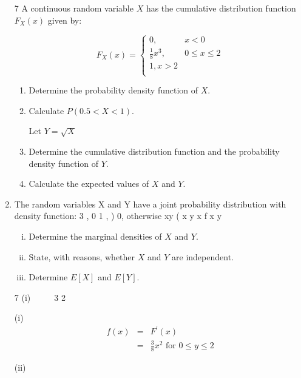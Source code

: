 \documentclass[a4paper,12pt]{article}
\begin{document}
\begin{enumerate}

7 A continuous random variable $X$ has the cumulative distribution function $F_X(x)$ given
by:


\[ F_X(x) = \begin{cases}
0, & x <0 \\
\frac{1}{8}x^3 , & 0 \leq x \leq 2\\
1, x > 2 \\
\end{cases}\]

\begin{enumerate}
\item Determine the probability density function of $X$. 
\item Calculate $P(0.5 <X< 1)$.

Let $Y =  \sqrt{X}$

\item Determine the cumulative distribution function and the probability density
function of $Y$. 
\item Calculate the expected values of $X$ and $Y$. 
\end{enumerate}
\item The random variables X and Y have a joint probability distribution with density
function:
  3 , 0 1
, )
0, otherwise
xy (
  x y x
  f x y
     
  
  
  
\begin{enumerate}[(i)]
\item Determine the marginal densities of $X$ and $Y$. 
\item State, with reasons, whether $X$ and $Y$ are independent. 
\item Determine $E[X]$ and $E[Y]$. 
\end{enumerate}
  
  7 (i)     3 2


(i) 
\begin{eqnarray*}
f ( x ) &=& F ^{\prime} ( x ) \\  
&=& \frac{3}{8} x^2 \mbox{ for } 0 \leq y \leq 2
\end{eqnarray*}



(ii) 


\end{enumerate}
\end{document}
